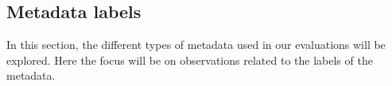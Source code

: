 \subsection{Metadata labels}\label{sec:appendix_meta_data}
In this section, the different types of metadata used in our evaluations will be explored. 
Here the focus will be on observations related to the labels of the metadata.



